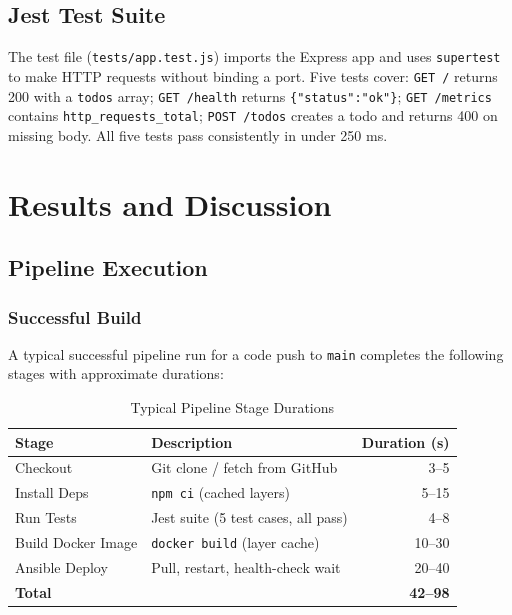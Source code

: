 \documentclass[12pt,a4paper]{report}
\begin{document}
\section{Jest Test Suite}
The test file (\texttt{tests/app.test.js}) imports the Express app and uses \texttt{supertest} to make HTTP requests without binding a port. Five tests cover: \texttt{GET /} returns 200 with a \texttt{todos} array; \texttt{GET /health} returns \texttt{\{"status":"ok"\}}; \texttt{GET /metrics} contains \texttt{http\_requests\_total}; \texttt{POST /todos} creates a todo and returns 400 on missing body. All five tests pass consistently in under 250 ms.

\chapter{Results and Discussion}

\section{Pipeline Execution}

\subsection{Successful Build}
A typical successful pipeline run for a code push to \texttt{main} completes the following stages with approximate durations:

\begin{table}[H]
\centering
\caption{Typical Pipeline Stage Durations}
\label{tab:build_times}
\begin{tabularx}{\textwidth}{@{}lXr@{}}
\toprule
\textbf{Stage} & \textbf{Description} & \textbf{Duration (s)} \\
\midrule
Checkout          & Git clone / fetch from GitHub           & 3--5 \\
Install Deps      & \texttt{npm ci} (cached layers)         & 5--15 \\
Run Tests         & Jest suite (5 test cases, all pass)     & 4--8 \\
Build Docker Image & \texttt{docker build} (layer cache)   & 10--30 \\
Ansible Deploy    & Pull, restart, health-check wait       & 20--40 \\
\midrule
\textbf{Total}    &                                         & \textbf{42--98} \\
\bottomrule
\end{tabularx}
\end{table}
\end{document}
